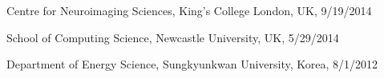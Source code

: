 \documentclass[11pt,letter]{article}
\renewenvironment{itemize}{
  \begin{list}{}{
    \setlength{\leftmargin}{1.5em}
    \setlength{\itemsep}{0.25em}
    \setlength{\parskip}{0pt}
    \setlength{\parsep}{0.25em}
  }
}{
  \end{list}
}
\begin{document}
\begin{itemize}
\item
Centre for Neuroimaging Sciences, King's College London, UK, 9/19/2014



\item
School of Computing Science, Newcastle University, UK, 5/29/2014






\item
 Department of Energy Science, Sungkyunkwan University, Korea, 8/1/2012



\end{itemize}
\end{document}
